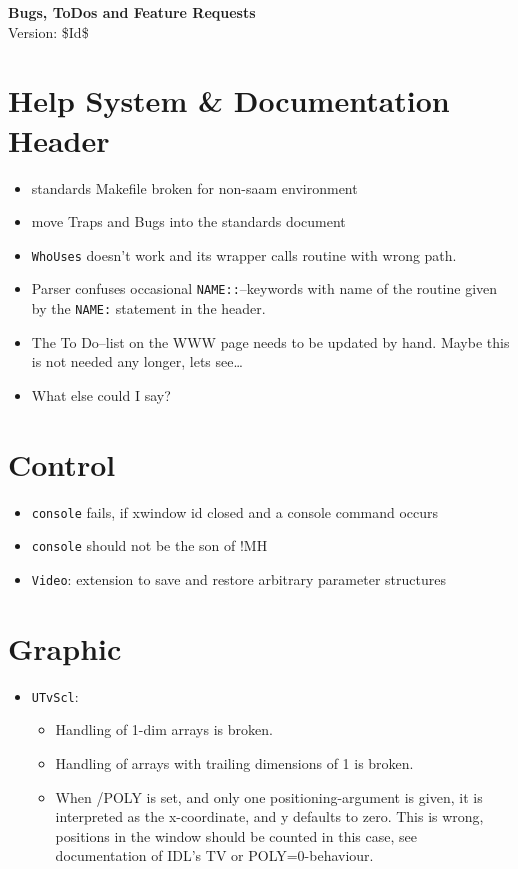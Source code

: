 \documentclass[12pt]{article}
\begin{document}
\begin{center}
{\Huge\textbf{Bugs, ToDos and Feature Requests}}\\[2cm]
Version: \$Id$ $\$ 
\end{center}

\section{Help System \& Documentation Header} 

\begin{itemize}
\item standards Makefile broken for non-saam environment
\item move Traps and Bugs into the standards document
\item \texttt{WhoUses} doesn't work and its wrapper calls routine with wrong path.
\item Parser confuses occasional \texttt{NAME::}--keywords with name
  of the routine given by the \texttt{NAME:} statement in the header.
\item The To Do--list on the WWW page needs to be updated by
  hand. Maybe this is not needed any longer, lets see\ldots
\item What else could I say?
\end{itemize}



\section{Control}
\begin{itemize}
\item \texttt{console} fails, if xwindow id closed and a console command occurs
\item \texttt{console} should not be the son of !MH
\item \texttt{Video}: extension to save and restore arbitrary parameter structures
\end{itemize}


\section{Graphic}
\begin{itemize}
\item \texttt{UTvScl}:
\begin{itemize}
  \item Handling of 1-dim arrays is broken.
  \item Handling of arrays with trailing dimensions of 1 is broken.
  \item When /POLY is set, and only one positioning-argument is given,
    it is interpreted as the x-coordinate, and y defaults to zero.
    This is wrong, positions in the window should be counted in this
    case, see documentation of IDL's TV or POLY=0-behaviour.
\end{itemize}
\end{itemize}
\end{document}
